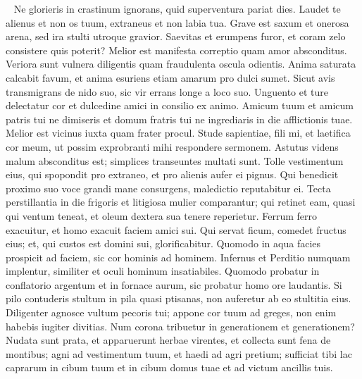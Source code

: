 \begin{biblechapter}   
\verse Ne glorieris in crastinum ignorans, quid superventura pariat dies. 
\verse Laudet te alienus et non os tuum, extraneus et non labia tua. 
\verse Grave est saxum et onerosa arena, sed ira stulti utroque gravior. 
\verse Saevitas et erumpens furor, et coram zelo consistere quis poterit? 
\verse Melior est manifesta correptio quam amor absconditus. 
\verse Veriora sunt vulnera diligentis quam fraudulenta oscula odientis. 
\verse Anima saturata calcabit favum, et anima esuriens etiam amarum pro dulci sumet. 
\verse Sicut avis transmigrans de nido suo, sic vir errans longe a loco suo. 
\verse Unguento et ture delectatur cor et dulcedine amici in consilio ex animo. 
\verse Amicum tuum et amicum patris tui ne dimiseris et domum fratris tui ne ingrediaris in die afflictionis tuae. Melior est vicinus iuxta quam frater procul. 
\verse Stude sapientiae, fili mi, et laetifica cor meum, ut possim exprobranti mihi respondere sermonem. 
\verse Astutus videns malum absconditus est; simplices transeuntes multati sunt. 
\verse Tolle vestimentum eius, qui spopondit pro extraneo, et pro alienis aufer ei pignus. 
\verse Qui benedicit proximo suo voce grandi mane consurgens, maledictio reputabitur ei. 
\verse Tecta perstillantia in die frigoris et litigiosa mulier comparantur; 
\verse qui retinet eam, quasi qui ventum teneat, et oleum dextera sua tenere reperietur. 
\verse Ferrum ferro exacuitur, et homo exacuit faciem amici sui. 
\verse Qui servat ficum, comedet fructus eius; et, qui custos est domini sui, glorificabitur. 
\verse Quomodo in aqua facies prospicit ad faciem, sic cor hominis ad hominem. 
\verse Infernus et Perditio numquam implentur, similiter et oculi hominum insatiabiles. 
\verse Quomodo probatur in conflatorio argentum et in fornace aurum, sic probatur homo ore laudantis. 
\verse Si pilo contuderis stultum in pila quasi ptisanas, non auferetur ab eo stultitia eius. 
\verse Diligenter agnosce vultum pecoris tui; appone cor tuum ad greges, 
\verse non enim habebis iugiter divitias. Num corona tribuetur in generationem et generationem? 
\verse Nudata sunt prata, et apparuerunt herbae virentes, et collecta sunt fena de montibus; 
\verse agni ad vestimentum tuum, et haedi ad agri pretium; 
\verse sufficiat tibi lac caprarum in cibum tuum et in cibum domus tuae et ad victum ancillis tuis. 
\end{biblechapter}

